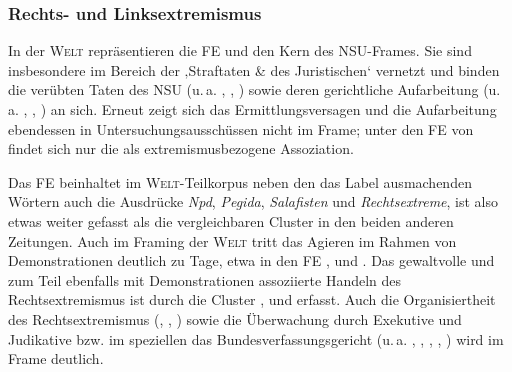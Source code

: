 \subsubsection{Rechts- und Linksextremismus}\label{rechts--und-linksextremismus-10}

In der \textsc{Welt} repräsentieren die FE  und  den Kern des NSU-Frames. Sie sind insbesondere im Bereich der ‚Straftaten \& des Juristischen` vernetzt und binden die verübten Taten des NSU (u.\,a. , , ) sowie deren gerichtliche Aufarbeitung (u.\,a. , , ) an sich. Erneut zeigt sich das Ermittlungsversagen und die Aufarbeitung ebendessen in Untersuchungsausschüssen nicht im Frame; unter den FE von  findet sich nur die  als extremismusbezogene Assoziation.

Das FE  beinhaltet im \textsc{Welt}-Teilkorpus neben den das Label ausmachenden Wörtern auch die Ausdrücke \emph{Npd}, \emph{Pegida}, \emph{Salafisten} und \emph{Rechtsextreme}, ist also etwas weiter gefasst als die vergleichbaren Cluster in den beiden anderen Zeitungen. Auch im Framing der \textsc{Welt} tritt das Agieren im Rahmen von Demonstrationen deutlich zu Tage, etwa in den FE ,  und . Das gewaltvolle und zum Teil ebenfalls mit Demonstrationen assoziierte Handeln des Rechtsextremismus ist durch die Cluster ,  und  erfasst. Auch die Organisiertheit des Rechtsextremismus (, , ) sowie die Überwachung durch Exekutive und Judikative bzw. im speziellen das Bundesverfassungsgericht (u.\,a. , , , , ) wird im Frame deutlich.

